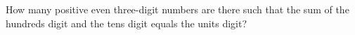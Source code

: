 How many positive even three-digit numbers are there such that the sum of the hundreds digit and the tens digit equals the units digit?

